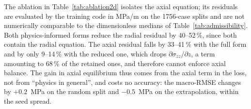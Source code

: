 The ablation in Table~\ref{tab:ablation2d} isolates the axial equation; its residuals are evaluated by the training code in MPa/m on the 1756-case splits and are not numerically comparable to the dimensionless medians of Table~\ref{tab:admissibility}. %
Both physics-informed forms reduce the radial residual by 40--52\,\%, since both contain the radial equation. The axial residual falls by 33--41\,\% with the full form and by only 9--14\,\% with the reduced one, which drops $\partial\sigma_{zz}/\partial z$, a term amounting to 68\,\% of the retained ones, and therefore cannot enforce axial balance. The gain in axial equilibrium thus comes from the axial term in the loss, not from ``physics in general'', and costs no accuracy: the macro-RMSE changes by $+0.2$~MPa on the random split and $-0.5$~MPa on the extrapolation, within the seed spread.


